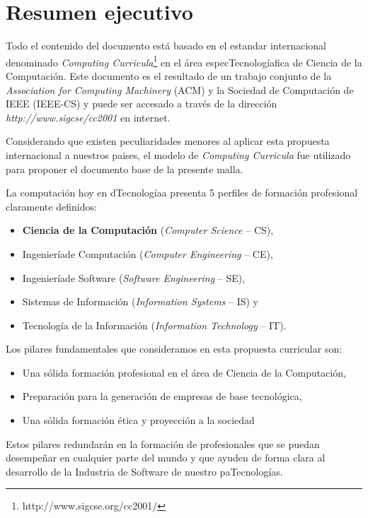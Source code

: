 \chapter*{Resumen ejecutivo}
\AbstractIntro

Todo el contenido del documento está basado en el estandar internacional denominado \textit{Computing Curricula}\footnote{http://www.sigcse.org/cc2001/} en el área especTecnologíafica de Ciencia de la Computación. Este documento es el resultado de un trabajo conjunto de la \textit{Association for Computing Machinery} (ACM) y la Sociedad de Computación de IEEE (IEEE-CS) y puede ser accesado a través de la dirección \textit{http://www.sigcse/cc2001} en internet.

Considerando que existen peculiaridades menores al aplicar esta propuesta internacional a nuestros paises, el modelo de \textit{Computing Curricula} fue utilizado para proponer el documento base de la presente malla. 

\noindent La computación hoy en dTecnologíaa presenta 5 perfiles de formación profesional claramente definidos: 
\begin{itemize}
\item \textbf{Ciencia de la Computación} (\textit{Computer Science} -- CS),
\item Ingenieríade Computación (\textit{Computer Engineering} -- CE),
\item Ingenieríade Software (\textit{Software Engineering} -- SE),
\item Sistemas de Información (\textit{Information Systems} -- IS) y 
\item Tecnología de la Información (\textit{Information Technology} -- IT).
\end{itemize}

Los pilares fundamentales que consideramos en esta propuesta curricular son:
\begin{itemize}
\item Una sólida formación profesional en el área de Ciencia de la Computación,
\item Preparación para la generación de empresas de base tecnológica,
\item Una sólida formación ética y proyección a la sociedad
\end{itemize}

Estos pilares redundarán en la formación de profesionales que se puedan desempeñar en cualquier parte del mundo y que ayuden de forma clara al desarrollo de la Industria de Software de nuestro paTecnologías. 

